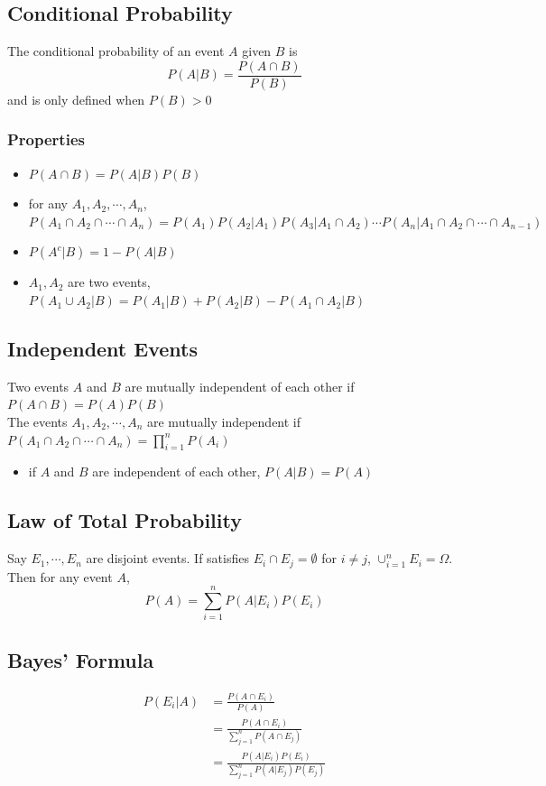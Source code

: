 \documentclass[11pt]{article}
\newcommand{\ds}{\displaystyle}
\begin{document}
\subsection{Conditional Probability}
The conditional probability of an event $A$ given $B$ is 
\[P(A|B)=\frac{P(A\cap B)}{P(B)}\]
and is only defined when $P(B)>0$
\subsubsection*{Properties}
\begin{itemize}
    \item $P(A\cap B) = P(A|B)P(B)$
    \item for any $A_1,A_2,\cdots,A_n$, $P(A_1\cap A_2\cap\cdots\cap A_n)=P(A_1)P(A_2|A_1)P(A_3|A_1\cap A_2)\cdots P(A_n|A_1\cap A_2\cap\cdots\cap A_{n-1})$
    \item $P(A^c|B)=1-P(A|B)$
    \item $A_1,A_2$ are two events, $P(A_1\cup A_2|B)=P(A_1|B)+P(A_2|B)-P(A_1\cap A_2|B)$
\end{itemize}
\subsection{Independent Events}
Two events $A$ and $B$ are mutually independent of each other if $P(A\cap B)=P(A)P(B)$ \\
The events $A_1,A_2,\cdots,A_n$ are mutually independent if $\ds P(A_1\cap A_2\cap\cdots\cap A_n)=\prod_{i=1}^{n}P(A_i)$ 
\begin{itemize}
    \item if $A$ and $B$ are independent of each other, $P(A|B) = P(A)$
\end{itemize}
\subsection{Law of Total Probability}
Say $E_1,\cdots,E_n$ are disjoint events. If satisfies $E_i\cap E_j=\emptyset$ for $i\neq j$, $\cup_{i=1}^n E_i=\Omega$. Then for any event $A$, 
\[P(A) = \sum_{i=1}^n P(A|E_i)P(E_i)\]
\subsection{Bayes' Formula}
\begin{align*}
    P(E_i|A) &= \frac{P(A\cap E_i)}{P(A)} \\
             &= \frac{P(A\cap E_i)}{\sum_{j=1}^n P(A\cap E_j)} \\
             &= \frac{P(A|E_i)P(E_i)}{\sum_{j=1}^{n}P(A|E_j)P(E_j)}
\end{align*}
\end{document}
